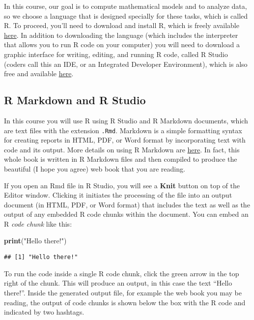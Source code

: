 \documentclass[
]{book}
\newenvironment{Shaded}{\begin{snugshade}}{\end{snugshade}}
\newcommand{\KeywordTok}[1]{\textcolor[rgb]{0.13,0.29,0.53}{\textbf{#1}}}
\newcommand{\NormalTok}[1]{#1}
\newcommand{\StringTok}[1]{\textcolor[rgb]{0.31,0.60,0.02}{#1}}
\theoremstyle{definition}
\theoremstyle{definition}
\theoremstyle{definition}
\theoremstyle{remark}
\begin{document}
In this course, our goal is to compute mathematical models and to analyze data, so we choose a language that is designed specially for these tasks, which is called R. To proceed, you'll need to download and install R, which is freely available \href{cran.r-project.org/}{here}. In addition to downloading the language (which includes the interpreter that allows you to run R code on your computer) you will need to download a graphic interface for writing, editing, and running R code, called R Studio (coders call this an IDE, or an Integrated Developer Environment), which is also free and available \href{www.rstudio.com/products/rstudio/download/}{here}.

\hypertarget{r-markdown-and-r-studio}{%
\subsection{R Markdown and R Studio}\label{r-markdown-and-r-studio}}

In this course you will use R using R Studio and R Markdown documents, which are text files with the extension \texttt{.Rmd}. Markdown is a simple formatting syntax for creating reports in HTML, PDF, or Word format by incorporating text with code and its output. More details on using R Markdown are \href{rmarkdown.rstudio.com}{here}. In fact, this whole book is written in R Markdown files and then compiled to produce the beautiful (I hope you agree) web book that you are reading.

If you open an Rmd file in R Studio, you will see a \textbf{Knit} button on top of the Editor window. Clicking it initiates the processing of the file into an output document (in HTML, PDF, or Word format) that includes the text as well as the output of any embedded R code chunks within the document. You can embed an R \emph{code chunk} like this:

\begin{Shaded}
\begin{Highlighting}[]
\KeywordTok{print}\NormalTok{(}\StringTok{"Hello there!"}\NormalTok{) }
\end{Highlighting}
\end{Shaded}

\begin{verbatim}
## [1] "Hello there!"
\end{verbatim}

To run the code inside a single R code chunk, click the green arrow in the top right of the chunk. This will produce an output, in this case the text ``Hello there!''. Inside the generated output file, for example the web book you may be reading, the output of code chunks is shown below the box with the R code and indicated by two hashtags.
\end{document}
